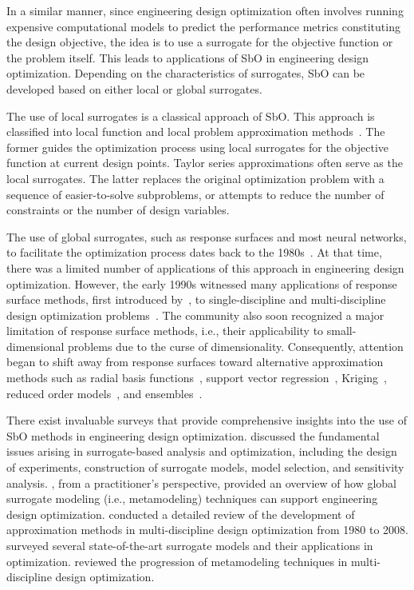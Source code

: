 \documentclass[iicol,sn-basic]{sn-jnl}%
\begin{document}
In a similar manner, since engineering design optimization often involves running expensive computational models to predict the performance metrics constituting the design objective, the idea is to use a surrogate for the objective function or the problem itself.
This leads to applications of SbO in engineering design optimization.
Depending on the characteristics of surrogates, SbO can be developed based on either local or global surrogates.

The use of local surrogates is a classical approach of SbO.
This approach is classified into local function and local problem approximation methods~\citep{Barthelemy1993}.
The former guides the optimization process using local surrogates for the objective function at current design points.
Taylor series approximations often serve as the local surrogates.
The latter replaces the original optimization problem with a sequence of easier-to-solve subproblems, or attempts to reduce the number of constraints or the number of design variables.

The use of global surrogates, such as response surfaces and most neural networks, to facilitate the optimization process dates back to the 1980s~\citep{Barthelemy1993}.
At that time, there was a limited number of applications of this approach in engineering design optimization.
However, the early 1990s witnessed many applications of response surface methods, first introduced by~\cite{Box1951}, to single-discipline and multi-discipline design optimization problems~\citep{Sobieski1997}.
The community also soon recognized a major limitation of response surface methods, i.e., their applicability to small-dimensional problems due to the curse of dimensionality.
Consequently, attention began to shift away from response surfaces toward alternative approximation methods such as radial basis functions~\citep{Hussain2002}, support vector regression~\citep{Girosi1998}, Kriging~\citep{Cressie1990,Kleijnen2009}, reduced order models~\citep{Antoulas2005}, and ensembles~\citep{Goel2007,LiuH2020}. 

There exist invaluable surveys that provide comprehensive insights into the use of SbO methods in engineering design optimization.
\cite{Queipo2005} discussed the fundamental issues arising in surrogate-based analysis and optimization, including the design of experiments, construction of surrogate models, model selection, and sensitivity analysis.
\cite{Wang2006}, from a practitioner’s perspective, provided an overview of how global surrogate modeling (i.e., metamodeling) techniques can support engineering design optimization. 
\cite{Simpson2008} conducted a detailed review of the development of approximation methods in multi-discipline design optimization from 1980 to 2008.
\cite{Forrester2009} surveyed several state-of-the-art surrogate models and their applications in optimization.
\cite{Viana2014} reviewed the progression of metamodeling techniques in multi-discipline design optimization.
\end{document}
